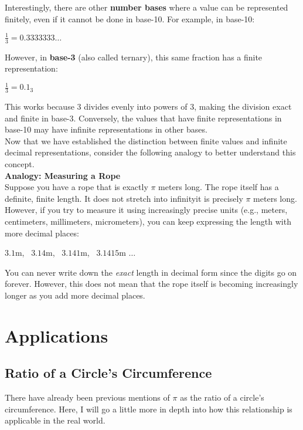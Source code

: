 \documentclass[12pt]{article}
\begin{document}
\noindent Interestingly, there are other \textbf{number bases} where a value can be represented finitely, even if it cannot be done in base-10. For example, in base-10:
\begin{center}
    $\frac{1}{3} = 0.3333333 \ldots$
\end{center}

\noindent However, in \textbf{base-3} (also called ternary), this same fraction has a finite representation:
\begin{center}
    $\frac{1}{3} = 0.1_3$
\end{center}

\noindent This works because 3 divides evenly into powers of 3, making the division exact and finite in base-3. Conversely, the values that have finite representations in base-10 may have infinite representations in other bases.\\

\noindent Now that we have established the distinction between finite values and infinite decimal representations, consider the following analogy to better understand this concept.\\

\noindent \textbf{Analogy: Measuring a Rope}\\

\noindent Suppose you have a rope that is exactly $\pi$ meters long. The rope itself has a definite, finite length. It does not stretch into infinity\textendash it is precisely $\pi$ meters long. However, if you try to measure it using increasingly precise units (e.g., meters, centimeters, millimeters, micrometers), you can keep expressing the length with more decimal places:
\begin{center}
    $3.1$m, \ $3.14$m, \ $3.141$m, \ $3.1415$m $\ldots$
\end{center}
You can never write down the \textit{exact} length in decimal form since the digits go on forever. However, this does not mean that the rope itself is becoming increasingly longer as you add more decimal places. 

\section{Applications}

\subsection{Ratio of a Circle's Circumference}
There have already been previous mentions of $\pi$ as the ratio of a circle's circumference. Here, I will go a little more in depth into how this relationship is applicable in the real world.\\
\end{document}
